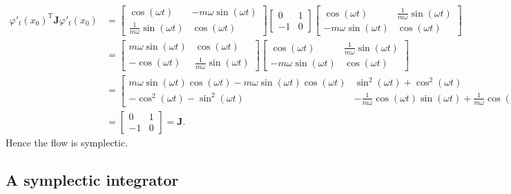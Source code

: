 \documentclass{report}
\theoremstyle{exampstyle} \newtheorem{example}[theorem]{Example}
\theoremstyle{exampstyle} \newtheorem{remark}[theorem]{Remark}
\theoremstyle{exampstyle} \newtheorem{definition}[theorem]{Definition}
\theoremstyle{exampstyle} \newtheorem{lemma}[theorem]{Lemma}
\theoremstyle{exampstyle} \newtheorem{proposition}[theorem]{Proposition}
\begin{document}
\begin{align*}
	\varphi'_t(x_0)^\mathrm{T} \mathbf{J} \varphi'_t(x_0) &= \begin{bmatrix}
		\cos(\omega t) & -m\omega \sin(\omega t) \\
		\frac{1}{m\omega} \sin(\omega t) & \cos(\omega t)
	\end{bmatrix} \begin{bmatrix}
		0 & 1 \\
		-1 & 0
	\end{bmatrix} \begin{bmatrix}
		\cos(\omega t) & \frac{1}{m\omega} \sin(\omega t) \\
		-m\omega \sin(\omega t) & \cos(\omega t)
	\end{bmatrix} \\
	&= \begin{bmatrix}
		m \omega \sin(\omega t) & \cos(\omega t) \\
		-\cos(\omega t) & \frac{1}{m \omega} \sin(\omega t)
	\end{bmatrix} \begin{bmatrix}
		\cos(\omega t) & \frac{1}{m\omega} \sin(\omega t) \\
		-m\omega \sin(\omega t) & \cos(\omega t)
	\end{bmatrix} \\
	&= \begin{bmatrix}
		m \omega \sin(\omega t) \cos(\omega t) - m \omega \sin(\omega t) \cos(\omega t)  & \sin^2(\omega t) + \cos^2(\omega t) \\
		-\cos^2(\omega t) - \sin^2(\omega t) & -\frac{1}{m\omega}\cos(\omega t)\sin(\omega t) + \frac{1}{m \omega}\cos(\omega t)\sin(\omega t)
	\end{bmatrix} \\
	&= \begin{bmatrix}
		0 & 1 \\
		-1 & 0
	\end{bmatrix} = \mathbf{J}.
\end{align*}
Hence the flow is symplectic.

\subsection{A symplectic integrator}
\end{document}
